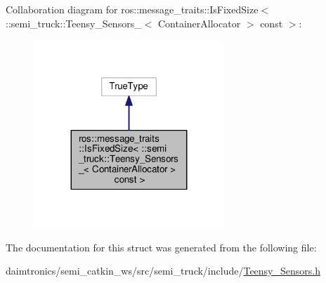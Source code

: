 Collaboration diagram for ros\+:\+:message\+\_\+traits\+:\+:Is\+Fixed\+Size$<$ \+:\+:semi\+\_\+truck\+:\+:Teensy\+\_\+\+Sensors\+\_\+$<$ Container\+Allocator $>$ const $>$\+:\nopagebreak
\begin{figure}[H]
\begin{center}
\leavevmode
\includegraphics[width=203pt]{structros_1_1message__traits_1_1_is_fixed_size_3_01_1_1semi__truck_1_1_teensy___sensors___3_01_cb1921b0987cc8a964f9a9efc7494c7a8}
\end{center}
\end{figure}


The documentation for this struct was generated from the following file\+:\begin{DoxyCompactItemize}
\item 
daimtronics/semi\+\_\+catkin\+\_\+ws/src/semi\+\_\+truck/include/\hyperlink{_teensy___sensors_8h}{Teensy\+\_\+\+Sensors.\+h}\end{DoxyCompactItemize}
